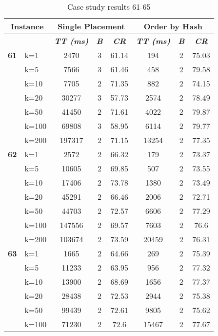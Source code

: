    \begin{table}[htbp]
    \caption{Case study results 61-65}
    \centering
    \begin{tabular}{|l|l|c|c|c|c|c|c|}
    \hline
    \multicolumn{ 2}{|c|}{\textbf{Instance}} & \multicolumn{ 3}{c|}{\textbf{Single Placement}} & \multicolumn{ 3}{c|}{\textbf{Order by Hash}} \\ \hline
    \multicolumn{ 2}{|l|}{} & \textbf{\textit{TT (ms)}} & \textbf{\textit{B}} & \textbf{\textit{CR}} & \textbf{\textit{TT (ms)}} & \textbf{\textit{B}} & \textbf{\textit{CR}} \\ \hline
    \multicolumn{1}{|r|}{\textbf{61}} & k=1 & 2470 & 3 & 61.14 & 194 & 2 & 75.03 \\ 
     & k=5 & 7566 & 3 & 61.46 & 458 & 2 & 79.58 \\ 
     & k=10 & 7705 & 2 & 71.35 & 882 & 2 & 74.15 \\ 
     & k=20 & 30277 & 3 & 57.73 & 2574 & 2 & 78.49 \\ 
     & k=50 & 41450 & 2 & 71.61 & 4022 & 2 & 79.87 \\ 
     & k=100 & 69808 & 3 & 58.95 & 6114 & 2 & 79.77 \\ 
     & k=200 & 197317 & 2 & 71.15 & 13254 & 2 & 77.35 \\ \hline
    \multicolumn{1}{|r|}{\textbf{62}} & k=1 & 2572 & 2 & 66.32 & 179 & 2 & 73.37 \\ 
     & k=5 & 10605 & 2 & 69.85 & 507 & 2 & 73.55 \\ 
     & k=10 & 17406 & 2 & 73.78 & 1380 & 2 & 73.49 \\ 
     & k=20 & 45291 & 2 & 66.46 & 2006 & 2 & 72.71 \\ 
     & k=50 & 44703 & 2 & 72.57 & 6606 & 2 & 77.29 \\ 
     & k=100 & 147556 & 2 & 69.57 & 7603 & 2 & 76.6 \\ 
     & k=200 & 103674 & 2 & 73.59 & 20459 & 2 & 76.31 \\ \hline
    \multicolumn{1}{|r|}{\textbf{63}} & k=1 & 1665 & 2 & 64.66 & 269 & 2 & 75.39 \\ 
     & k=5 & 11233 & 2 & 63.95 & 956 & 2 & 77.32 \\ 
     & k=10 & 13900 & 2 & 68.69 & 1656 & 2 & 77.37 \\ 
     & k=20 & 28438 & 2 & 72.53 & 2944 & 2 & 75.38 \\ 
     & k=50 & 99439 & 2 & 72.61 & 9805 & 2 & 75.62 \\ 
     & k=100 & 71230 & 2 & 72.6 & 15467 & 2 & 77.67 \\ 

\end{tabular}
\end{table}
